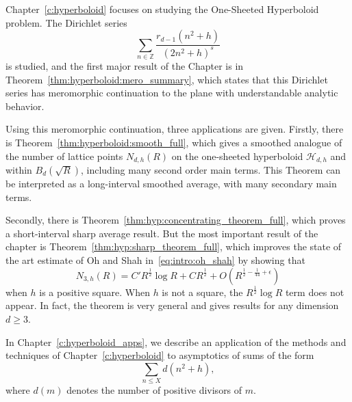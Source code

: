 Chapter~\ref{c:hyperboloid} focuses on studying the One-Sheeted Hyperboloid problem.
The Dirichlet series
\begin{equation}
  \sum_{n \in \mathbb{Z}} \frac{r_{d-1}(n^2 + h)}{(2n^2 + h)^s}
\end{equation}
is studied, and the first major result of the Chapter is in
Theorem~\ref{thm:hyperboloid:mero_summary}, which states that this Dirichlet series has
meromorphic continuation to the plane with understandable analytic behavior.

Using this meromorphic continuation, three applications are given.
Firstly, there is Theorem~\ref{thm:hyperboloid:smooth_full}, which gives a smoothed
analogue of the number of lattice points $N_{d,h}(R)$ on the one-sheeted hyperboloid
$\mathcal{H}_{d,h}$ and within $B_d(\sqrt R)$, including many second order main terms.
This Theorem can be interpreted as a long-interval smoothed average, with many secondary
main terms.


Secondly, there is Theorem~\ref{thm:hyp:concentrating_theorem_full}, which proves a
short-interval sharp average result.
But the most important result of the chapter is Theorem~\ref{thm:hyp:sharp_theorem_full},
which improves the state of the art estimate of Oh and Shah in~\eqref{eq:intro:oh_shah} by
showing that
\begin{equation}
  N_{3,h}(R) = C' R^{\frac{1}{2}} \log R + C R^{\frac{1}{2}} + O(R^{\frac{1}{2} -
  \frac{1}{44} + \epsilon})
\end{equation}
when $h$ is a positive square.
When $h$ is not a square, the $R^{\frac{1}{2}} \log R$ term does not appear.
In fact, the theorem is very general and gives results for any dimension $d \geq 3$.


In Chapter~\ref{c:hyperboloid_apps}, we describe an application of the methods and
techniques of Chapter~\ref{c:hyperboloid} to asymptotics of sums of the form
\begin{equation}
  \sum_{n \leq X} d(n^2 + h),
\end{equation}
where $d(m)$ denotes the number of positive divisors of $m$.


